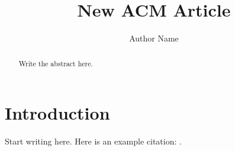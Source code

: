 \documentclass[sigconf]{acmart}
\title{New ACM Article}
\author{Author Name}
\affiliation{%
  \institution{Institution}
  \country{Country}%
}
\begin{document}
\begin{abstract}
  Write the abstract here.
\end{abstract}

\maketitle

\section{Introduction}
Start writing here. Here is an example citation: \cite{lamport1994}.



\end{document}
